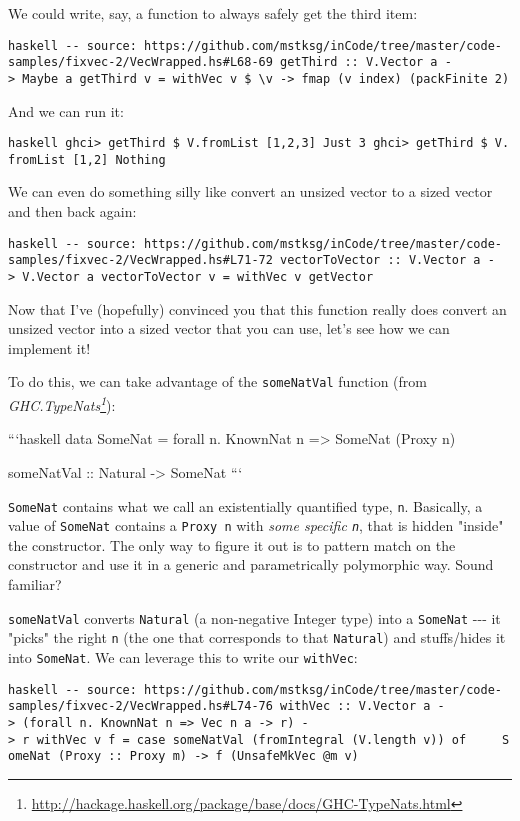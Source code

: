 \documentclass[]{article}
\renewcommand{\href}[2]{#2\footnote{\url{#1}}}
\begin{document}
We could write, say, a function to always safely get the third item:

\texttt{haskell\ -\/-\ source:\ https://github.com/mstksg/inCode/tree/master/code-samples/fixvec-2/VecWrapped.hs\#L68-69\ getThird\ ::\ V.Vector\ a\ -\textgreater{}\ Maybe\ a\ getThird\ v\ =\ withVec\ v\ \$\ \textbackslash{}v\textquotesingle{}\ -\textgreater{}\ fmap\ (v\textquotesingle{}\ \textasciigrave{}index\textasciigrave{})\ (packFinite\ 2)}

And we can run it:

\texttt{haskell\ ghci\textgreater{}\ getThird\ \$\ V.fromList\ {[}1,2,3{]}\ Just\ 3\ ghci\textgreater{}\ getThird\ \$\ V.fromList\ {[}1,2{]}\ Nothing}

We can even do something silly like convert an unsized vector to a sized vector
and then back again:

\texttt{haskell\ -\/-\ source:\ https://github.com/mstksg/inCode/tree/master/code-samples/fixvec-2/VecWrapped.hs\#L71-72\ vectorToVector\ ::\ V.Vector\ a\ -\textgreater{}\ V.Vector\ a\ vectorToVector\ v\ =\ withVec\ v\ getVector}

Now that I've (hopefully) convinced you that this function really does convert
an unsized vector into a sized vector that you can use, let's see how we can
implement it!

To do this, we can take advantage of the \texttt{someNatVal} function (from
\emph{\href{http://hackage.haskell.org/package/base/docs/GHC-TypeNats.html}{GHC.TypeNats}}):

```haskell data SomeNat = forall n. KnownNat n =\textgreater{} SomeNat (Proxy n)

someNatVal :: Natural -\textgreater{} SomeNat ```

\texttt{SomeNat} contains what we call an existentially quantified type,
\texttt{n}. Basically, a value of \texttt{SomeNat} contains a \texttt{Proxy\ n}
with \emph{some specific \texttt{n}}, that is hidden "inside" the constructor.
The only way to figure it out is to pattern match on the constructor and use it
in a generic and parametrically polymorphic way. Sound familiar?

\texttt{someNatVal} converts \texttt{Natural} (a non-negative Integer type) into
a \texttt{SomeNat} -\/-\/- it "picks" the right \texttt{n} (the one that
corresponds to that \texttt{Natural}) and stuffs/hides it into \texttt{SomeNat}.
We can leverage this to write our \texttt{withVec}:

\texttt{haskell\ -\/-\ source:\ https://github.com/mstksg/inCode/tree/master/code-samples/fixvec-2/VecWrapped.hs\#L74-76\ withVec\ ::\ V.Vector\ a\ -\textgreater{}\ (forall\ n.\ KnownNat\ n\ =\textgreater{}\ Vec\ n\ a\ -\textgreater{}\ r)\ -\textgreater{}\ r\ withVec\ v\ f\ =\ case\ someNatVal\ (fromIntegral\ (V.length\ v))\ of\ \ \ \ \ SomeNat\ (Proxy\ ::\ Proxy\ m)\ -\textgreater{}\ f\ (UnsafeMkVec\ @m\ v)}
\end{document}
